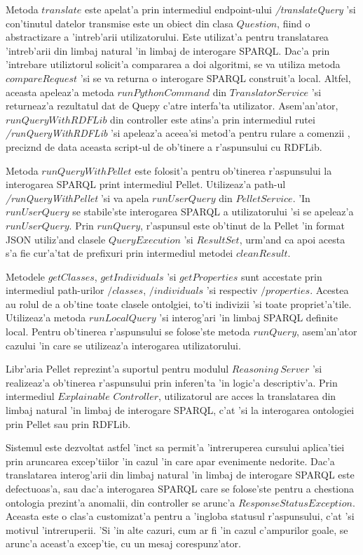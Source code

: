 \documentclass[12pt,a4paper,twoside]{report}
\begin{document}
Metoda $translate$ este apelat'a prin intermediul endpoint-ului {\it /translateQuery} 'si con'tinutul datelor transmise este un obiect din clasa $Question$, fiind o abstractizare a 'intreb'arii utilizatorului. Este utilizat'a pentru translatarea 'intreb'arii din limbaj natural 'in limbaj de interogare SPARQL.  Dac'a prin 'intrebare utiliztorul solicit'a compararea a doi algoritmi, se va utiliza metoda $compareRequest$ 'si se va returna o interogare SPARQL construit'a local. Altfel, aceasta apeleaz'a metoda $runPythonCommand$ din $TranslatorService$ 'si returneaz'a rezultatul dat de Quepy c'atre interfa'ta utilizator. Asem'an'ator, $runQueryWithRDFLib$ din controller este atins'a prin intermediul rutei {\it /runQueryWithRDFLib} 'si apeleaz'a aceea'si metod'a pentru rulare a comenzii , preciz\ia nd de data aceasta script-ul de ob'tinere a r'aspunsului cu RDFLib.

Metoda $runQueryWithPellet$ este folosit'a pentru ob'tinerea r'aspunsului la interogarea SPARQL print intermediul Pellet. Utilizeaz'a path-ul {\it /runQueryWithPellet} 'si va apela $runUserQuery$ din $PelletService$. 'In $runUserQuery$ se stabile'ste interogarea SPARQL a utilizatorului 'si se apeleaz'a $runUserQuery$. Prin $runQuery$, r'aspunsul este ob'tinut de la Pellet 'in format JSON utiliz'and clasele $QueryExecution$ 'si $ResultSet$, urm'and ca apoi acesta s'a fie cur'a'tat de prefixuri prin intermediul metodei $cleanResult$.

Metodele $getClasses$, $getIndividuals$ 'si $getProperties$ sunt accestate prin intermediul path-urilor $/classes$, $/individuals$ 'si respectiv $/properties$. Acestea au rolul de a ob'tine toate clasele ontolgiei, to'ti indivizii 'si toate propriet'a'tile. Utilizeaz'a metoda $runLocalQuery$ 'si interog'ari 'in limbaj SPARQL definite local. Pentru ob'tinerea r'aspunsului se folose'ste metoda $runQuery$, asem'an'ator cazului 'in care se utilizeaz'a interogarea utilizatorului.

Libr'aria Pellet reprezint'a suportul pentru modulul $Reasoning\ Server$ 'si realizeaz'a ob'tinerea r'aspunsului prin inferen'ta 'in logic'a descriptiv'a. Prin intermediul $Explainable$ $Controller$, utilizatorul are acces la translatarea din limbaj natural 'in limbaj de interogare SPARQL, c'at 'si la interogarea ontologiei prin Pellet sau prin RDFLib.

Sistemul este dezvoltat astfel 'inc\ia t sa permit'a 'intreruperea cursului aplica'tiei prin aruncarea excep'tiilor 'in cazul 'in care apar evenimente nedorite. Dac'a translatarea interog'arii din limbaj natural 'in limbaj de interogare SPARQL este defectuoas'a, sau dac'a interogarea SPARQL care se folose'ste pentru a chestiona ontologia prezint'a anomalii, din controller se arunc'a $ResponseStatusException$. Aceasta este o clas'a customizat'a pentru a 'ingloba statusul r'aspunsului, c'at 'si motivul 'intreruperii. 'Si 'in alte cazuri, cum ar fi 'in cazul c'ampurilor goale, se arunc'a aceast'a excep'tie, cu un mesaj corespunz'ator.
\end{document}
